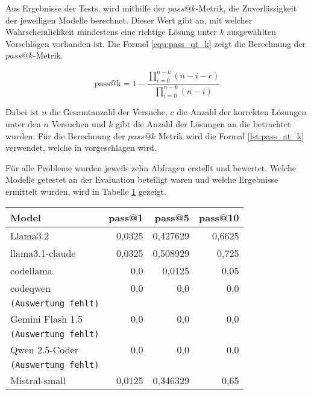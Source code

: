 Aus Ergebnisse der Tests, wird mithilfe der $pass@k$-Metrik, die Zuverlässigkeit der jeweiligen Modelle berechnet. Dieser Wert gibt an, mit welcher Wahrscheinlichkeit mindestens eine richtige Lösung unter $k$ ausgewählten Vorschlägen vorhanden ist. Die Formel \ref{equ:pass_qt_k} zeigt die Berechnung der $pass@k$-Metrik.

\begin{equation}\label{equ:pass_qt_k}
	\text{pass@k} = 1 - \frac{\prod_{i=0}^{n-k} (n - i - c)}{\prod_{i=0}^{n-k} (n - i)}
\end{equation}

Dabei ist $n$ die Gesamtanzahl der Versuche, $c$ die Anzahl der korrekten Lösungen unter den $n$ Versuchen und $k$ gibt die Anzahl der Lösungen an die betrachtet wurden. Für die Berechnung der $pass@k$ Metrik wird die Formal \ref{lst:pass_at_k} verwendet, welche in \cite{chen-2021} vorgeschlagen wird.\vspace{0.2cm}

Für alle Probleme wurden jeweils zehn Abfragen erstellt und bewertet. Welche Modelle getestet an der Evaluation beteiligt waren und welche Ergebnisse ermittelt wurden, wird in Tabelle \ref{tab:prompt_results_open_models} gezeigt.

\begin{table}[!ht]
	\begin{tabular}{l|r|r|r}
		\textbf{Model} & \textbf{pass@1} & \textbf{pass@5} & \textbf{pass@10} \\
		\hline
		Llama3.2 & 0,0325 & 0,427629 & 0,6625 \\
		llama3.1-claude & 0,0325 & 0,508929 & 0,725 \\
		codellama & 0,0 & 0,0125 & 0,05 \\
		codeqwen & 0,0 & 0,0 & 0,0 \\
		\texttt{(Auswertung fehlt)} &&& \\
		Gemini Flash 1.5 & 0,0 & 0,0 & 0,0\\
		\texttt{(Auswertung fehlt)} &&& \\
		Qwen 2.5-Coder & 0,0 & 0,0 & 0,0 \\
		\texttt{(Auswertung fehlt)} &&& \\
		Mistral-small & 0,0125 & 0,346329 & 0,65 \\
	\end{tabular}
	\centering
	\label{tab:prompt_results_open_models}
\end{table}


